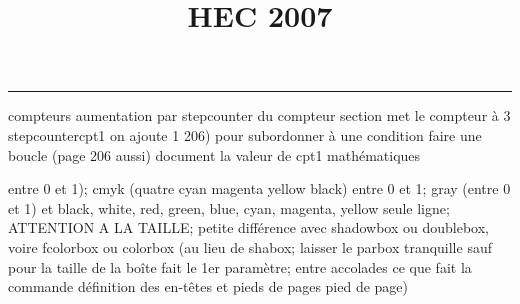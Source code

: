 \documentclass[11pt]{article}%
\title{\bf \vspace{-1cm} HEC 2007} %
\author{} %
\date{} %
\renewcommand{\headrulewidth}{0pt}%
\renewcommand{\footrulewidth}{0.4pt}%
\begin{document}
\maketitle %
\vspace{-1.2cm}\hrule %
\thispagestyle{fancy}

\vspace*{.4cm}


compteurs%
aumentation par stepcounter du compteur section%
met le compteur à 3%
stepcounter{cpt1} on ajoute 1%
206) pour subordonner à une condition %
faire une boucle (page 206 aussi) %
document la valeur de cpt1 
mathématiques\newcommand{\ch}{\operatorname{ch}} 
\newcommand{\sh}{\operatorname{sh}}
\renewcommand{\tanh}{\operatorname{th}}
\renewcommand{\sinh}{\operatorname{sh}}
\renewcommand{\cosh}{\operatorname{ch}}
\newcommand{\argsh}{\operatorname{argsh}}
\newcommand{\argch}{\operatorname{argch}}
\newcommand{\argth}{\operatorname{argth}}
\newcommand{\Id}{\operatorname{Id}}
\renewcommand{\leq}{\leq}
\renewcommand{\geq}{\geq }

\newcommand{\dlim}{\lim}
\newcommand{\dsum}{\sum}
\newcommand{\dprod}{\prod}



entre 0 et 1); cmyk (quatre cyan magenta yellow black) entre 0 et 1;
gray (entre 0 et 1) et black, white, red, green, blue, cyan, magenta,
yellow%
seule ligne; ATTENTION A LA TAILLE; petite différence avec shadowbox ou
doublebox, voire fcolorbox ou colorbox (au lieu de shabox; laisser le
parbox tranquille sauf pour la taille de la boîte
\newcommand{\Tbox}[1]{\begin{center} \shabox{\parbox{0.6
\linewidth}{#1}} \end{center}} %
fait le 1er paramètre; entre accolades ce que fait la commande
définition des en-têtes et pieds de pages\pagestyle{fancy}
\chead{}
\rfoot[ \ \thepage]{\thepage}
\cfoot{}
\lfoot{}
\thispagestyle{fancy} %
pied de page)\renewcommand{\footrulewidth}{0.4pt}
\renewcommand{\headrulewidth}{0.4pt}
\end{document}
